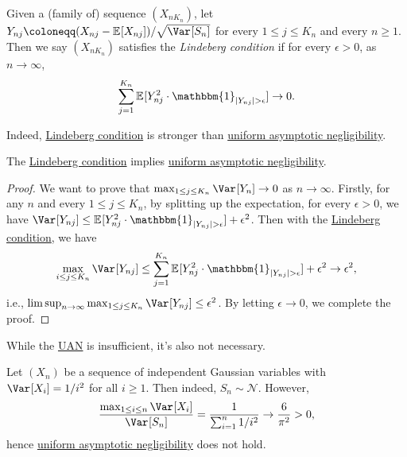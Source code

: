 \begin{definition}\label{def:Lindeberg-condition}
	Given a (family of) sequence \((X_{n K_n})\), let \(Y_{nj} \coloneqq (X_{nj} - \mathbb{E}_{}[X_{nj}] ) / \sqrt{\Var_{}[S_n] }\) for every \(1 \leq j \leq K_n\) and every \(n \geq 1\). Then we say \((X_{n K_n})\) satisfies the \emph{Lindeberg condition} if for every \(\epsilon > 0\), as \(n \to \infty \),
	\[
		\sum_{j=1}^{K_n} \mathbb{E}_{}[Y_{nj}^2 \cdot \mathbbm{1}_{\vert Y_{nj} \vert > \epsilon } ] \to 0.
	\]
\end{definition}

Indeed, \hyperref[def:Lindeberg-condition]{Lindeberg condition} is stronger than \hyperref[def:uniform-asymptotic-negligibility]{uniform asymptotic negligibility}.

\begin{proposition}\label{prop:Lindeberg-condition-implies-UAN}
	The \hyperref[def:Lindeberg-condition]{Lindeberg condition} implies \hyperref[def:uniform-asymptotic-negligibility]{uniform asymptotic negligibility}.
\end{proposition}
\begin{proof}
	We want to prove that \(\max _{1 \leq j \leq K_n} \Var_{}[Y_n] \to 0\) as \(n \to \infty \). Firstly, for any \(n\) and every \(1 \leq j \leq K_n\), by splitting up the expectation, for every \(\epsilon > 0\), we have \(\Var_{}[Y_{nj}] \leq \mathbb{E}_{}[Y_{nj}^2 \cdot \mathbbm{1}_{\vert Y_{nj} \vert > \epsilon } ] + \epsilon ^2\). Then with the \hyperref[def:Lindeberg-condition]{Lindeberg condition}, we have
	\[
		\max _{i \leq j \leq K_n} \Var_{}[Y_{nj}]
		\leq \sum_{j=1}^{K_n} \mathbb{E}_{}[Y_{nj}^2 \cdot \mathbbm{1}_{\vert Y_{nj} \vert > \epsilon } ] + \epsilon ^2
		\to \epsilon ^2,
	\]
	i.e., \(\limsup_{n \to \infty} \max _{1 \leq j \leq K_n} \Var_{}[Y_{nj}]  \leq \epsilon ^2\). By letting \(\epsilon \to 0\), we complete the proof.
\end{proof}

While the \hyperref[def:uniform-asymptotic-negligibility]{UAN} is insufficient, it's also not necessary.

\begin{remark}
	Let \((X_n)\) be a sequence of independent Gaussian variables with \(\Var_{}[X_i] = 1 / i^2\) for all \(i \geq 1\). Then indeed, \(S_n \sim \mathcal{N} \). However,
	\[
		\frac{\max _{1 \leq i \leq n} \Var_{}[X_i]}{\Var_{}[S_n]} = \frac{1}{\sum_{i=1}^{n} 1 / i^2} \to \frac{6}{\pi ^2} > 0 ,
	\]
	hence \hyperref[def:uniform-asymptotic-negligibility]{uniform asymptotic negligibility} does not hold.
\end{remark}

